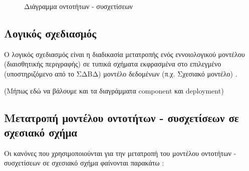 \documentclass{assignment}
\begin{document}
\begin{landscape}
\begin{figure}
\begin{center}
\caption{Διάγραμμα οντοτήτων - συσχετίσεων}
\label{fig:ER:diagram}
\end{center}
\end{figure}
\end{landscape}

\subsection{Λογικός σχεδιασμός}

Ο λογικός σχεδιασμός είναι η διαδικασία μετατροπής ενός εννοιολογικού μοντέλου (διαισθητικής περιγραφής) σε τυπικά σχήματα εκφρασμένα στο επιλεγμένο (υποστηριζόμενο από το ΣΔΒΔ) μοντέλο δεδομένων (π.χ. Σχεσιακό μοντέλο) \cite{theodoridis_class_notes}.


(Μήπως εδώ να βάλουμε και τα διαγράμματα component και deployment)

\subsection{Μετατροπή μοντέλου οντοτήτων - συσχετίσεων σε σχεσιακό σχή\-μα}

Οι κανόνες που χρησιμοποιούνται για την μετατροπή του μοντέλου οντοτήτων - συσχετίσεων σε σχεσιακό σχήμα φαίνονται παρακάτω \cite{theodoridis_class_notes}:
\end{document}
